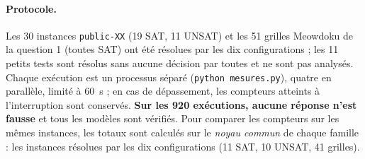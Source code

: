 \documentclass[11pt,a4paper]{article}
\begin{document}
\paragraph{Protocole.} Les 30 instances \texttt{public-XX} (19 SAT, 11 UNSAT) et les 51 grilles
Meowdoku de la question 1 (toutes SAT) ont été résolues par les dix configurations ; les
11 petits tests sont résolus sans aucune décision par toutes et ne sont pas analysés. Chaque
exécution est un processus séparé (\texttt{python mesures.py}), quatre en parallèle, limité à
60~s ; en cas de dépassement, les compteurs atteints à l'interruption sont conservés.
\textbf{Sur les 920 exécutions, aucune réponse n'est fausse} et tous les modèles sont vérifiés.
Pour comparer les compteurs sur les mêmes instances, les totaux sont calculés sur le
\emph{noyau commun} de chaque famille : les instances résolues par les dix configurations
(11 SAT, 10 UNSAT, 41 grilles).
\end{document}
